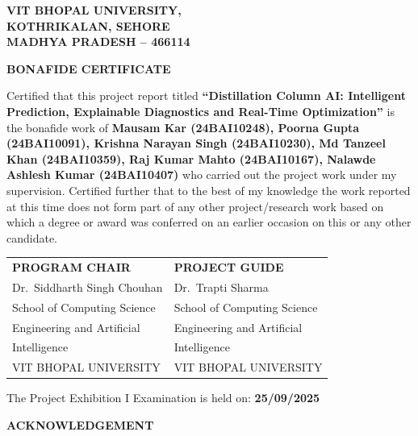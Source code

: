 \documentclass[12pt,a4paper]{report}
\begin{document}
\clearpage
\thispagestyle{empty}
\begin{center}
{\bfseries\large VIT BHOPAL UNIVERSITY,}\\
{\bfseries\large KOTHRIKALAN, SEHORE}\\
{\bfseries\large MADHYA PRADESH -- 466114}

\vspace{1cm}
{\Large\bfseries BONAFIDE CERTIFICATE}
\end{center}

\vspace{0.6cm}
Certified that this project report titled \textbf{``Distillation Column AI: Intelligent
Prediction, Explainable Diagnostics and Real-Time Optimization''} is the bonafide work
of \textbf{Mausam Kar (24BAI10248), Poorna Gupta (24BAI10091), Krishna Narayan
Singh (24BAI10230), Md Tanzeel Khan (24BAI10359), Raj Kumar Mahto (24BAI10167),
Nalawde Ashlesh Kumar (24BAI10407)} who carried out the project work under my
supervision. Certified further that to the best of my knowledge the work reported at this
time does not form part of any other project/research work based on which a degree or
award was conferred on an earlier occasion on this or any other candidate.

\vspace{1.5cm}
\begin{tabular}{p{7cm}p{7cm}}
\textbf{PROGRAM CHAIR} & \textbf{PROJECT GUIDE} \\[10pt]
Dr.\ Siddharth Singh Chouhan & Dr.\ Trapti Sharma \\
School of Computing Science & School of Computing Science \\
Engineering and Artificial & Engineering and Artificial \\
Intelligence & Intelligence \\
VIT BHOPAL UNIVERSITY & VIT BHOPAL UNIVERSITY \\
\end{tabular}

\vspace{1.5cm}
The Project Exhibition I Examination is held on: \textbf{25/09/2025}

\clearpage
\thispagestyle{plain}
\begin{center}
{\Large\bfseries ACKNOWLEDGEMENT}
\end{center}
\vspace{0.6cm}
\end{document}
